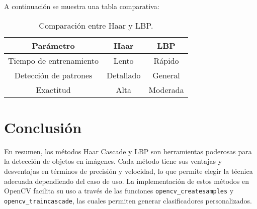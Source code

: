 \documentclass{article}
\begin{document}
A continuación se muestra una tabla comparativa:

\begin{table}[H]
    \centering
    \begin{tabular}{|c|c|c|}
        \hline
        \textbf{Parámetro}      & \textbf{Haar} & \textbf{LBP} \\
        \hline
        Tiempo de entrenamiento & Lento         & Rápido       \\
        Detección de patrones   & Detallado     & General      \\
        Exactitud               & Alta          & Moderada     \\
        \hline
    \end{tabular}
    \caption{Comparación entre Haar y LBP.}
\end{table}

\section{Conclusión}
En resumen, los métodos Haar Cascade y LBP son herramientas poderosas para la detección de objetos en imágenes. Cada método tiene sus ventajas y desventajas en términos de precisión y velocidad, lo que permite elegir la técnica adecuada dependiendo del caso de uso. La implementación de estos métodos en OpenCV facilita su uso a través de las funciones \texttt{opencv\_createsamples} y \texttt{opencv\_traincascade}, las cuales permiten generar clasificadores personalizados.



\end{document}
